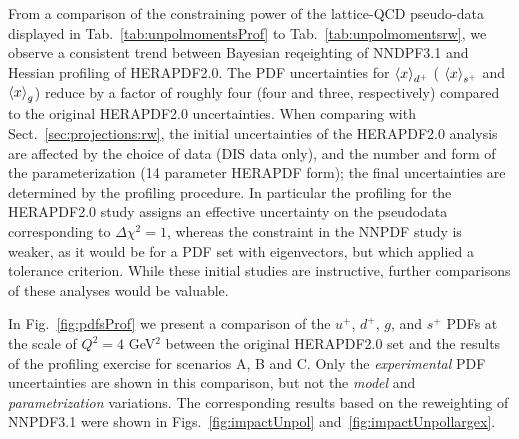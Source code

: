 From a comparison of the constraining power of the lattice-QCD pseudo-data  
displayed in Tab.~\ref{tab:unpolmomentsProf} to Tab.~\ref{tab:unpolmomentsrw},
we observe a consistent trend between Bayesian reqeighting of NNDPF3.1 and 
Hessian profiling of HERAPDF2.0.
%
The PDF uncertainties for $\left\langle x\right\rangle_{d^+}$ ( $\left\langle x\right\rangle_{s^+}$
and  $\left\langle x\right\rangle_g$) reduce by a factor of roughly
four (four and three, respectively) compared to the original
HERAPDF2.0 uncertainties.
%
When comparing with Sect.~\ref{sec:projections:rw},
the initial uncertainties of the HERAPDF2.0  analysis 
are affected by the choice of data (DIS data only), and 
the number and form of the parameterization (14 parameter HERAPDF form);
the final uncertainties are determined by the profiling procedure. 
%
In particular the profiling for the HERAPDF2.0 study assigns an effective 
uncertainty on the pseudodata corresponding to $\Delta\chi^2=1$, whereas the 
constraint in the NNPDF study is weaker, as it would be for a PDF set with 
eigenvectors, but which applied a tolerance criterion. 
%
While these initial studies are instructive, 
further comparisons of these analyses would be valuable. 

In Fig.~\ref{fig:pdfsProf} we present a comparison of the
$u^+$, $d^+$, $g$, and $s^+$ PDFs at the scale of $Q^2=4$ GeV$^2$
between the original  HERAPDF2.0 set and the results of the profiling
exercise for scenarios A, B and C.
%
Only the {\it experimental} PDF uncertainties are shown in this comparison,
but not the {\it model} and {\it parametrization} variations.
%
The corresponding results based on the reweighting
of NNPDF3.1 were shown in Figs.~\ref{fig:impactUnpol}
and~\ref{fig:impactUnpollargex}.

